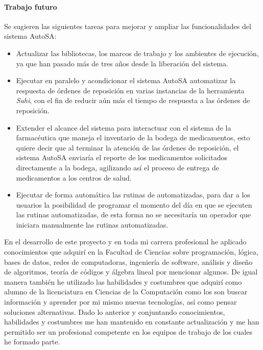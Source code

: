 \paragraph{Trabajo futuro\\}
Se sugieren las siguientes tareas para mejorar y ampliar las funcionalidades del sistema AutoSA:
\begin{itemize}
	\item Actualizar las bibliotecas, los marcos de trabajo y los ambientes de ejecución, ya que han pasado más de tres años desde la liberación del sistema.
	\item Ejecutar en paralelo y acondicionar el sistema AutoSA automatizar la respuesta de órdenes de reposición en varias instancias de la herramienta \textit{Sahi}, con el fin de reducir aún más el tiempo de respuesta a las órdenes de reposición.
	\item Extender el alcance del sistema para interactuar con el sistema de la farmacéutica que maneja el inventario de la bodega de medicamentos, esto quiere decir que al terminar la atención de las órdenes de reposición, el sistema AutoSA enviaría el reporte de los medicamentos solicitados directamente a la bodega, agilizando así el proceso de entrega de medicamentos a los centros de salud. 
	\item Ejecutar de forma automática las rutinas de automatizadas, para dar a los usuarios la posibilidad de programar el momento del día en que se ejecuten las rutinas automatizadas, de esta forma no se necesitaría un operador que iniciara manualmente las rutinas automatizadas.
\end{itemize}
En el desarrollo de este proyecto y en toda mi carrera profesional he aplicado conocimientos que adquirí en la Facultad de Ciencias sobre programación, lógica, bases de datos, redes de computadoras, ingeniería de software, análisis y diseño de algoritmos, teoría de códigos y álgebra lineal por mencionar algunos. De igual manera también he utilizado las habilidades y costumbres que adquirí como alumno de la licenciatura en Ciencias de la Computación como los son buscar información y aprender por mi mismo nuevas tecnologías, así como pensar soluciones alternativas. Dado lo anterior y conjuntando conocimientos, habilidades y costumbres me han mantenido en constante actualización y me han permitido ser un profesional competente en los equipos de trabajo de los cuales he formado parte.\\
